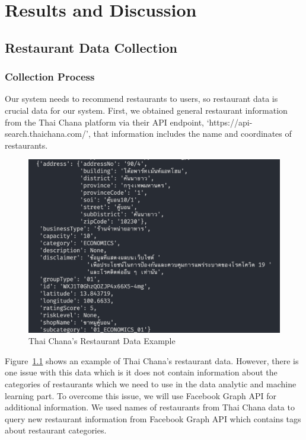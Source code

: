 \documentclass[12pt,oneside,openright,a4paper]{cpe-english-project}
\begin{document}
\chapter{Results and Discussion}

\section{Restaurant Data Collection}

\subsection{Collection Process}


Our system needs to recommend restaurants to users, so restaurant data is crucial data for our system. First, we obtained general restaurant information from the Thai Chana platform via their API endpoint, ‘https://api-search.thaichana.com/’, that information includes the name and coordinates of restaurants.

\begin{figure}[H]\centering
\includegraphics[width=400pt]{./images/4ThaiChanasRestaurantDataExample.png}
\caption{Thai Chana’s Restaurant Data Example}\label{fig:4ThaiChanasRestaurantDataExample}
\end{figure}\vspace{-24pt}

Figure~\ref{fig:4ThaiChanasRestaurantDataExample} shows an example of Thai Chana’s restaurant data. However, there is one issue with this data which is it does not contain information about the categories of restaurants which we need to use in the data analytic and machine learning part. To overcome this issue, we will use Facebook Graph API for additional information. We used names of restaurants from Thai Chana data to query new restaurant information from Facebook Graph API which contains tags about restaurant categories.
\end{document}
